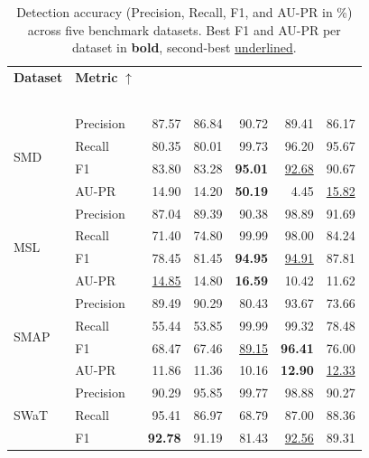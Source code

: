 \documentclass[twoside,11pt,openright]{report}
\begin{document}
\begin{table}[ht]
\centering
\caption{Detection accuracy (Precision, Recall, F1, and AU-PR in \%) across five benchmark datasets. 
Best F1 and AU-PR per dataset in \textbf{bold}, second-best \underline{underlined}.}
\label{tab:accuracy}
\begin{tabular}{ll rrrrr}
\toprule
\textbf{Dataset} & \textbf{Metric} $\uparrow$ & \thead{\textbf{TimesNet}\\\citep{timesnet2023}} & \thead{\textbf{ModTCN}\\\citep{moderntcn2024}} & \thead{\textbf{TranAD}\\\citep{tranad2022}} & \thead{\textbf{AnomTr.}\\\citep{anomalytransformer2022}} & \thead{\textbf{GTA}\\\citep{gta2022}} \\
\midrule
\multirow{4}{*}{SMD}
    & Precision & 87.57 & 86.84 & 90.72 & 89.41 & 86.17 \\
    & Recall    & 80.35 & 80.01 & 99.73 & 96.20 & 95.67 \\
    & F1        & 83.80 & 83.28 & \textbf{95.01} & \underline{92.68} & 90.67 \\
    & AU-PR     & 14.90 & 14.20 & \textbf{50.19} &  4.45 & \underline{15.82} \\
\midrule
\multirow{4}{*}{MSL}
    & Precision & 87.04 & 89.39 & 90.38 & 98.89 & 91.69 \\
    & Recall    & 71.40 & 74.80 & 99.99 & 98.00 & 84.24 \\
    & F1        & 78.45 & 81.45 & \textbf{94.95} & \underline{94.91} & 87.81 \\
    & AU-PR     & \underline{14.85} & 14.80 & \textbf{16.59} & 10.42 & 11.62 \\
\midrule
\multirow{4}{*}{SMAP}
    & Precision & 89.49 & 90.29 & 80.43 & 93.67 & 73.66 \\
    & Recall    & 55.44 & 53.85 & 99.99 & 99.32 & 78.48 \\
    & F1        & 68.47 & 67.46 & \underline{89.15} & \textbf{96.41} & 76.00 \\
    & AU-PR     & 11.86 & 11.36 & 10.16 & \textbf{12.90} & \underline{12.33} \\
\midrule
\multirow{4}{*}{SWaT}
    & Precision & 90.29 & 95.85 & 99.77 & 98.88 & 90.27 \\
    & Recall    & 95.41 & 86.97 & 68.79 & 87.00 & 88.36 \\
    & F1        & \textbf{92.78} & 91.19 & 81.43 & \underline{92.56} & 89.31 \\

\end{tabular}
\end{table}
\end{document}
